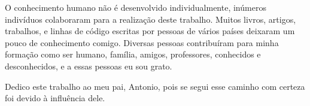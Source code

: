 \begin{agradecimentos}
	

    O conhecimento humano não é desenvolvido individualmente, inúmeros indivíduos colaboraram para a realização deste trabalho.
    Muitos livros, artigos, trabalhos, e linhas de código escritas por pessoas de vários países deixaram um pouco de conhecimento comigo.
    Diversas pessoas contribuíram para minha formação como ser humano, família, amigos, professores, conhecidos e desconhecidos, e a essas pessoas eu sou grato.

    Dedico este trabalho ao meu pai, Antonio, pois se segui esse caminho com certeza foi devido à influência dele.

\end{agradecimentos}